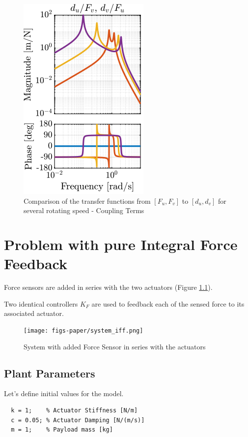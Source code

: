 \documentclass[a4paper, 10pt, DIV=12, parskip=full]{scrreprt}
\begin{document}
\begin{figure}[htbp]
\centering
\includegraphics[scale=1]{figs/plant_compare_rotating_speed_coupling.png}
\caption{\label{fig:plant_compare_rotating_speed_coupling}Comparison of the transfer functions from \([F_u, F_v]\) to \([d_u, d_v]\) for several rotating speed - Coupling Terms}
\end{figure}

\chapter{Problem with pure Integral Force Feedback}
\label{sec:org02f3cde}
\label{sec:iff_pure_int}
Force sensors are added in series with the two actuators (Figure \ref{fig:system_iff}).

Two identical controllers \(K_F\) are used to feedback each of the sensed force to its associated actuator.

\begin{figure}[htbp]
\centering
\texttt{[image: figs-paper/system\_iff.png]}
\caption{\label{fig:system_iff}System with added Force Sensor in series with the actuators}
\end{figure}

\section{Plant Parameters}
\label{sec:orgd2d5c32}
Let's define initial values for the model.
\begin{verbatim}
  k = 1;    % Actuator Stiffness [N/m]
  c = 0.05; % Actuator Damping [N/(m/s)]
  m = 1;    % Payload mass [kg]
\end{verbatim}
\end{document}
